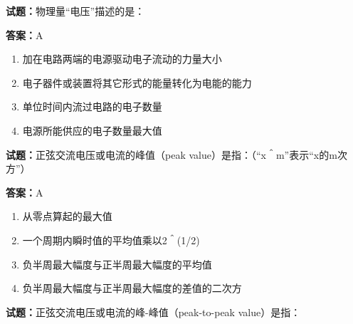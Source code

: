 \documentclass{ctexbook}
\begin{document}




\vspace{1em}

\textbf{试题：}物理量“电压”描述的是： 

\textbf{答案：}A 

\begin{enumerate}[leftmargin=3em]
  \item 加在电路两端的电源驱动电子流动的力量大小 

  \item 电子器件或装置将其它形式的能量转化为电能的能力 

  \item 单位时间内流过电路的电子数量 

  \item 电源所能供应的电子数量最大值 

\end{enumerate}






\vspace{1em}

\textbf{试题：}正弦交流电压或电流的峰值（peak value）是指：（“x＾m”表示“x的m次方”） 

\textbf{答案：}A 

\begin{enumerate}[leftmargin=3em]
  \item 从零点算起的最大值 

  \item 一个周期内瞬时值的平均值乘以2＾(1/2) 

  \item 负半周最大幅度与正半周最大幅度的平均值 

  \item 负半周最大幅度与正半周最大幅度的差值的二次方 

\end{enumerate}





\vspace{1em}

\textbf{试题：}正弦交流电压或电流的峰-峰值（peak-to-peak value）是指： 
\end{document}
